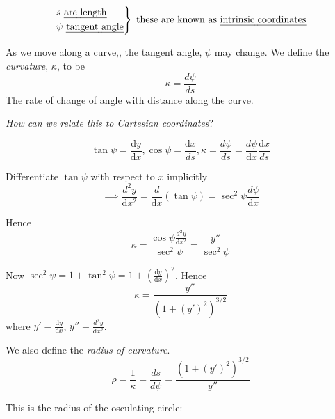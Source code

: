 \documentclass[10pt]{scrartcl}
\begin{document}
\begin{definition}
\[\begin{rcases*}
s \text{ \emph{arc length}}\\
\psi \text{ \emph{tangent angle}}	
\end{rcases*} \text{ these are known as \emph{intrinsic coordinates}}
\]
\end{definition}


\begin{definition}
As we move along a curve,, the tangent angle, $\psi$ may change. We define the \emph{curvature}, $\kappa$, to be 
\[\kappa = \frac{d\psi}{ds}\]	
The rate of change of angle with distance along the curve. 
\end{definition}

\emph{How can we relate this to Cartesian coordinates}? 

\[\tan\psi = \frac{\mathrm{d}y}{\mathrm{d}x}, \cos\psi = \frac{\mathrm{d}x}{ds}, \kappa = \frac{d\psi}{ds} = \frac{d\psi}{\mathrm{d}x}\frac{\mathrm{d}x}{ds}\]

Differentiate $\tan\psi$ with respect to $x$ implicitly
\[\implies \frac{d^2y}{\mathrm{d}x^2} = \frac{d}{\mathrm{d}x}(\tan\psi) = \sec^2\psi\frac{d\psi}{\mathrm{d}x}\]

Hence 
\[\kappa = \frac{\cos\psi\frac{d^2y}{\mathrm{d}x^2}}{\sec^2\psi} = \frac{y''}{\sec^2\psi}\]

Now $\sec^2\psi = 1 + \tan^2\psi = 1+\left(\frac{\mathrm{d}y}{\mathrm{d}x}\right)^2$. Hence 
\[\boxed{\kappa = \frac{y''}{(1 + (y')^2)^{3/2}}}\]
where $y' = \frac{\mathrm{d}y}{\mathrm{d}x}$, $y'' = \frac{d^2y}{\mathrm{d}x^2}$.\\

\begin{definition}
We also define the \emph{radius of curvature}. 
\[\rho = \frac{1}{\kappa} = \frac{ds}{d\psi} = \frac{(1 + (y')^2)^{3/2}}{y''}\]
\end{definition}

This is the radius of the osculating circle: 
\begin{center}
\end{center}
\vspace*{5pt}
\end{document}
